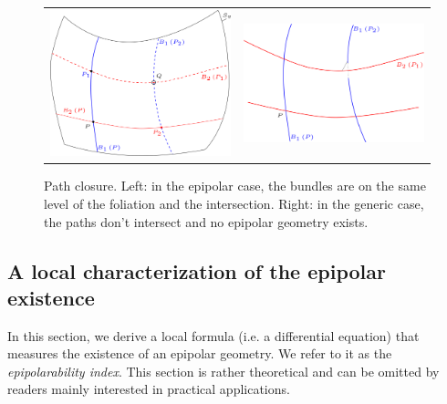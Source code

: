 \documentclass{ipol}
\begin{document}
\begin{figure}[h!]
\centering
\begin{tabular}{cc}
\includegraphics[width=7cm]{FIGS/ClothPathEpip.png} &
\includegraphics[width=7cm]{FIGS/ClothPathNonEpip.png}\\
\end{tabular}
\caption{Path closure. Left: in the epipolar case, the bundles are on the same level of the foliation and the intersection.
Right: in the generic case, the paths don't intersect and no epipolar geometry exists.}
\label{FigClothPath}
\end{figure}



\subsection{A local characterization of the epipolar existence}

In this section, we derive a local formula (i.e. a differential equation) that measures
the existence of an epipolar geometry. We refer to it as the \textit{epipolarability index}. This section is rather theoretical and
can be omitted by readers mainly interested in practical applications.
\end{document}
